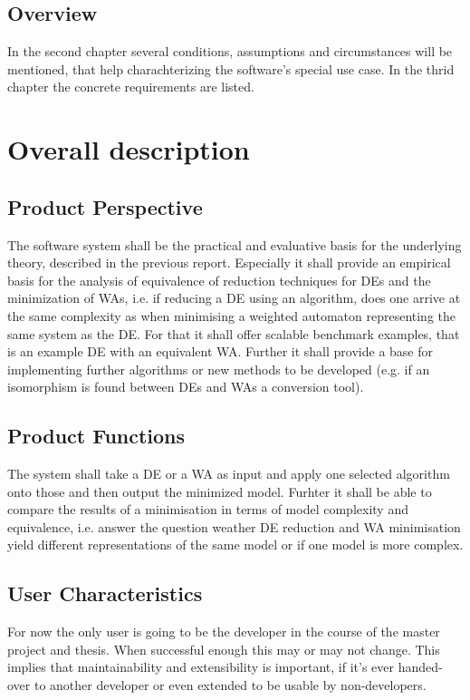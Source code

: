         
        \subsection{Overview}
            In the second chapter several conditions, assumptions and circumstances will be mentioned, that help charachterizing the software's special use case. In the thrid chapter the concrete requirements are listed.
    \newpage
            
            
    \section{Overall description}
        \subsection{Product Perspective}
            The software system shall be the practical and evaluative basis for the underlying theory, described in the previous report. Especially it shall provide an empirical basis for the analysis of equivalence of reduction techniques for DEs and the minimization of WAs, i.e. if reducing a DE using an algorithm, does one arrive at the same complexity as when minimising a weighted automaton representing the same system as the DE. For that it shall offer scalable benchmark examples, that is an example DE with an equivalent WA. Further it shall provide a base for implementing further algorithms or new methods to be developed (e.g. if an isomorphism is found between DEs and WAs a conversion tool).

        \subsection{Product Functions}
            The system shall take a DE or a WA as input and apply one selected algorithm onto those and then output the minimized model. Furhter it shall be able to compare the results of a minimisation in terms of model complexity and equivalence, i.e. answer the question weather DE reduction and WA minimisation yield different representations of the same model or if one model is more complex.

        \subsection{User Characteristics}
            For now the only user is going to be the developer in the course of the master project and thesis. When successful enough this may or may not change. This implies that maintainability and extensibility is important, if it's ever handed-over to another developer or even extended to be usable by non-developers.

